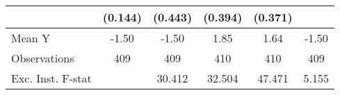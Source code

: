 {\begin{tabular}{l*{5}{c}}
            &     (0.144)         &     (0.443)         &     (0.394)         &     (0.371)         &                     \\
\midrule
Mean Y      &       -1.50         &       -1.50         &        1.85         &        1.64         &       -1.50         \\
Observations&         409         &         409         &         410         &         410         &         409         \\
Exc. Inst. F-stat&                     &      30.412         &      32.504         &      47.471         &       5.155         \\
\bottomrule
\end{tabular}
}

